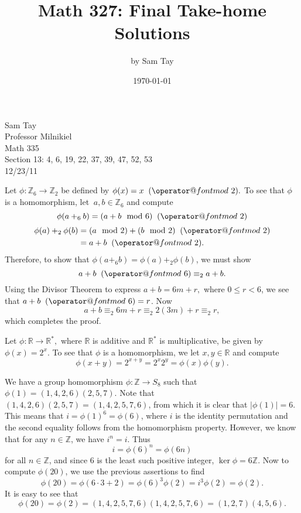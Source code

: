 \documentclass{article}
\title{Math 327: Final Take-home Solutions}
\author{by Sam Tay}
\date{\today}
\makeatletter
\newenvironment{problem1}[1]{\noindent {\bf Problem #1:}}
{\medskip}
\def\imod#1{\allowbreak\mkern10mu({\operator@font mod}\,\,#1)}
\makeatother
\begin{document}
\begin{flushright}Sam Tay\\ Professor Milnikiel \\ Math 335 \\ Section 13: 4, 6, 19, 22, 37, 39, 47, 52, 53\\ 12/23/11
\end{flushright}

\begin{problem1}{4} Let $\phi:\mathbb{Z}_6\to\mathbb{Z}_2$ be defined by $\phi(x) = x\imod{2}.$ To see that $\phi$ is a homomorphism, let $\ a,b\in\mathbb{Z}_6$ and compute $$\phi(a+_6b)= (a+ b \mod{6})\imod{2}$$ \begin{align*}\phi(a)+_2\phi(b)&=(a\mod{2})+(b\mod{2}) \imod{2} \\
&=a+b\imod{2}. \end{align*} Therefore, to show that $\phi(a+_6b)=\phi(a)+_2\phi(b)$, we must show $$a+b \imod{6} \equiv_2 a+b.$$ Using the Divisor Theorem to express $a+b=6m+r,$ where $0\le r<6$, we see that $a+b \imod{6} = r$. Now $$a+b \equiv_2 6m +r \equiv_2 2(3m) + r \equiv_2 r,$$ which completes the proof. 
\end{problem1}

\begin{problem1}{6} Let $\phi:\mathbb{R}\to\mathbb{R}^*,$ where $\mathbb{R}$ is additive and $\mathbb{R}^*$ is multiplicative, be given by $\phi(x)=2^x$. To see that $\phi$ is a homomorphism, we let $x,y\in\mathbb{R}$ and compute $$\phi(x+y)=2^{x+y}=2^x2^y=\phi(x)\phi(y).$$
\end{problem1}


\begin{problem1}{19} We have a group homomorphism $\phi:\mathbb{Z}\to S_8$ such that $\phi(1)=(1, 4, 2, 6)(2, 5, 7).$ Note that $(1, 4, 2, 6)(2, 5, 7)=(1, 4, 2, 5, 7, 6)$, from which it is clear that $|\phi(1)|=6$. This means that $i=\phi(1)^6=\phi(6)$, where $i$ is the identity permutation and the second equality follows from the homomorphism property. However, we know that for any $n\in\mathbb{Z}$, we have $i^n=i$. Thus $$i=\phi(6)^n=\phi(6n)$$ for all $n\in\mathbb{Z}$, and since $6$ is the least such positive integer, $\ker\phi=6\mathbb{Z}$. Now to compute $\phi(20)$, we use the previous assertions to find $$\phi(20)=\phi(6\cdot3 + 2)=\phi(6)^3\phi(2)=i^3\phi(2)=\phi(2).$$ It is easy to see that $$\phi(20)=\phi(2)=(1, 4, 2, 5, 7, 6)(1, 4, 2, 5, 7, 6)=(1, 2, 7)(4, 5, 6).$$
\end{problem1}
\end{document}
